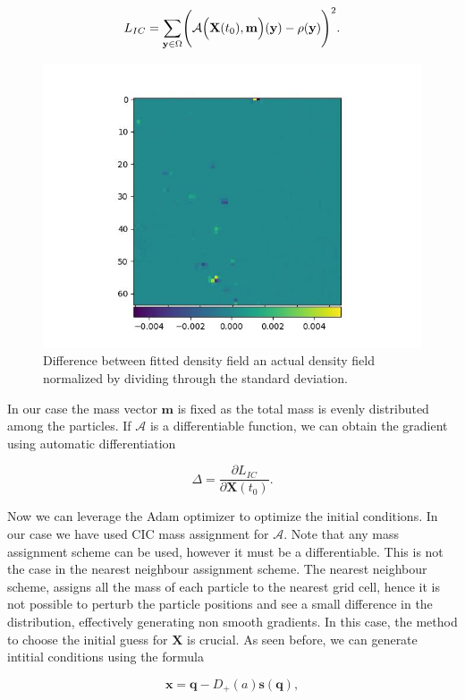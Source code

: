 \documentclass{article}
\begin{document}
{\begin{appendices}
\begin{equation}
    L_{IC} = \sum_{\mathbf{y} \in \Omega} \Biggl(\mathcal{A}\Bigl(\mathbf{X}(t_0), \mathbf{m}\Bigr)(\mathbf{y}) - \rho(\mathbf{y})\Biggr)^2.
\end{equation}

\begin{figure}[h]
    \centering
    \includegraphics[width=0.5\linewidth]{img/cmp.jpg}
    \caption{Difference between fitted density field an actual density field normalized by dividing through the standard deviation.}
    \label{fig:field-fit}
\end{figure}

In our case the mass vector $\mathbf{m}$ is fixed as the total mass is evenly distributed among the particles. If $\mathcal{A}$ is a differentiable function, we can obtain the gradient using automatic differentiation 

\begin{equation}
    \Delta = \frac{\partial L_{IC}}{\partial \mathbf{X}(t_0)}.
\end{equation}

Now we can leverage the Adam optimizer \citep{kingma2014adam} to optimize the initial conditions.
In our case we have used CIC mass assignment for $\mathcal{A}$. Note that any mass assignment scheme can be used, however it must be a differentiable. This is not the case in the nearest neighbour assignment scheme. The nearest neighbour scheme, assigns all the mass of each particle to the nearest grid cell, hence it is not possible to perturb the particle positions and see a small difference in the distribution, effectively generating non smooth gradients. In this case, the method to choose the initial guess for $\mathbf{X}$ is crucial. As seen before, we can generate intitial conditions using the formula

\begin{equation}
    \mathbf{x} = \mathbf{q} - D_{+}(a)\mathbf{s}(\mathbf{q}),
\end{equation}


\end{appendices}}
\end{document}
